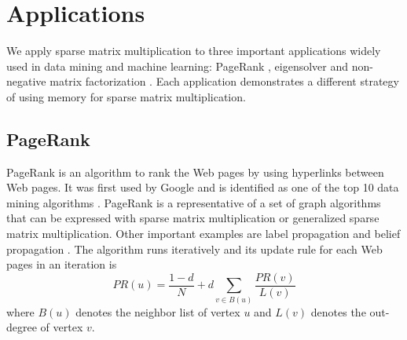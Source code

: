\section{Applications} \label{sec:spmm:apps}
We apply sparse matrix multiplication to three important applications widely
used in data mining and machine learning: PageRank \cite{pagerank},
eigensolver \cite{anasazi} and non-negative matrix factorization \cite{nmf}.
Each application demonstrates a different strategy of using memory for sparse
matrix multiplication.

\subsection{PageRank} \label{sec:pagerank}
PageRank is an algorithm to rank the Web pages by using hyperlinks between Web
pages. It was first used by Google and is identified as one of the top 10 data
mining algorithms \cite{top10}. PageRank is a representative of a set of graph
algorithms that can be expressed with sparse matrix multiplication or generalized
sparse matrix multiplication. Other important examples are label propagation
\cite{label_prop} and belief propagation \cite{Yedidia03}. The algorithm runs
iteratively and its update rule for each Web pages in an iteration is
\begin{equation*}
PR(u) = \frac{1-d}{N} + d \sum\limits_{v \in B(u)} \frac{PR(v)}{L(v)}
\end{equation*}
where $B(u)$ denotes the neighbor list of vertex $u$ and $L(v)$ denotes
the out-degree of vertex $v$. %




